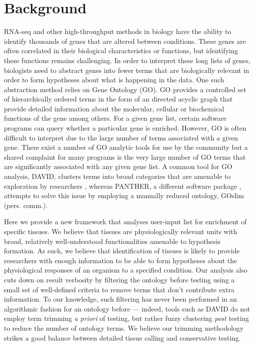\documentclass[linenumbers, doublespacing]{bmcart}
\begin{document}
\section*{Background}
	RNA-seq and other high-throughput methods in biology have the ability to identify thousands of genes that are altered between conditions. These genes are often correlated in their biological characteristics or functions, but identifying these functions remains challenging. In order to interpret these long lists of genes, biologists need to abstract genes into fewer terms that are biologically relevant in order to form hypotheses about what is happening in the data. One such abstraction method relies on Gene Ontology (GO). GO provides a controlled set of hierarchically ordered terms in the form of an directed acyclic graph\cite{TheGeneOntologyConsortium2000, Ontology2009, TheGeneOntologyConsortium2015} that provide detailed information about the molecular, cellular or biochemical functions of the gene among others. For a given gene list, certain software programs can query whether a particular gene is enriched\cite{Mi2009, McLean2010, Huang2009}. However, GO is often difficult to interpret due to the large number of terms associated with a given gene. There exist a number of GO analytic tools for use by the community but a shared complaint for many programs is the very large number of GO terms that are significantly associated with any given gene list.  A common tool for GO analysis, DAVID, clusters terms into broad categories that are amenable to exploration by researchers \cite{Huang2007}, whereas PANTHER, a different software package \cite{Mi2009, Mi2013}, attempts to solve this issue by employing a manually reduced ontology, GOslim (pers. comm.).
	
	Here we provide a new framework that analyses user-input list for enrichment of specific tissues. We believe that tissues are physiologically relevant units with broad, relatively well-understood functionalities amenable to hypothesis formation. As such, we believe that identification of tissues is likely to provide researchers with enough information to be able to form hypotheses about the physiological responses of an organism to a specified condition. Our analysis also cuts down on result verbosity by filtering the ontology before testing using a small set of well-defined criteria to remove terms that don’t contribute extra information. To our knowledge, such filtering has never been performed in an algorithmic fashion for an ontology before — indeed, tools such as DAVID do not employ term trimming \emph{a priori} of testing, but rather fuzzy clustering \emph{post} testing to reduce the number of ontology terms. We believe our trimming methodology strikes a good balance between detailed tissue calling and conservative testing. 
	
\end{document}

